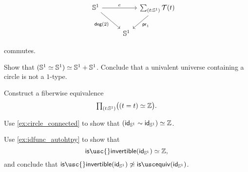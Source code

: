 \begin{exercises}
\begin{subexenum}
\begin{equation*}
\begin{tikzcd}[column sep=tiny]
\sphere{1} \arrow[rr,"e"] \arrow[dr,swap,"\mathsf{deg}(2)"] & & \sm{t:\sphere{1}}\mathcal{T}(t) \arrow[dl,"\proj 1"] \\
\phantom{\sm{t:\sphere{1}}\mathcal{T}(t)} & \sphere{1}
\end{tikzcd}
\end{equation*}
commutes.
\end{subexenum}
\item Show that $\eqv{(\eqv{\sphere{1}}{\sphere{1}})}{\sphere{1}+\sphere{1}}$. Conclude that a univalent universe containing a circle is not a $1$-type.
\item \label{ex:is_invertible_id_S1}
\begin{subexenum}
\item Construct a fiberwise equivalence
\begin{equation*}
\prd{t:\sphere{1}} \big(\eqv{(t=t)}{\Z}\big).
\end{equation*}
\item Use \cref{ex:circle_connected} to show that $\eqv{(\idfunc[\sphere{1}]\htpy\idfunc[\sphere{1}])}{\Z}$.
\item Use \cref{ex:idfunc_autohtpy} to show that
\begin{equation*}
\eqv{\mathsf{is\usc{}invertible}(\idfunc[\sphere{1}])}{\Z},
\end{equation*}
and conclude that ${\mathsf{is\usc{}invertible}}(\idfunc[\sphere{1}])\not\simeq{\isequiv(\idfunc[\sphere{1}])}$. 
\end{subexenum}
\end{exercises}
